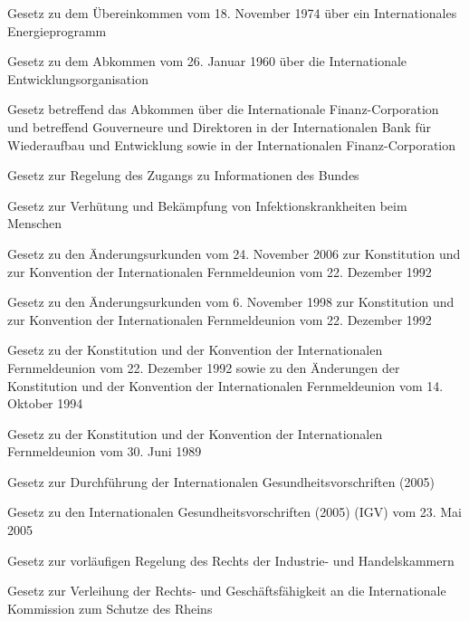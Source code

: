 \item[{IEnProgÜbkG}] Gesetz zu dem Übereinkommen vom 18. November 1974 über ein Internationales Energieprogramm

\item[{IEntwOrgAbkG}] Gesetz zu dem Abkommen vom 26. Januar 1960 über die Internationale Entwicklungsorganisation

\item[{IFCAbkG}] Gesetz betreffend das Abkommen über die Internationale Finanz-Corporation und betreffend Gouverneure und Direktoren in der Internationalen Bank für Wiederaufbau und Entwicklung sowie in der Internationalen Finanz-Corporation

\item[{IFG}] Gesetz zur Regelung des Zugangs zu Informationen des Bundes

\item[{IfSG}] Gesetz zur Verhütung und Bekämpfung von Infektionskrankheiten beim Menschen

\item[{IFUKK1992ÄndUrk1996G}] Gesetz zu den Änderungsurkunden vom 24. November 2006 zur Konstitution und zur Konvention der Internationalen Fernmeldeunion vom 22. Dezember 1992

\item[{IFUKK1992ÄndUrkG}] Gesetz zu den Änderungsurkunden vom 6. November 1998 zur Konstitution und zur Konvention der Internationalen Fernmeldeunion vom 22. Dezember 1992

\item[{IFUKK1992G}] Gesetz zu der Konstitution und der Konvention der Internationalen Fernmeldeunion vom 22. Dezember 1992 sowie zu den Änderungen der Konstitution und der Konvention der Internationalen Fernmeldeunion vom 14. Oktober 1994

\item[{IFUKKG}] Gesetz zu der Konstitution und der Konvention der Internationalen Fernmeldeunion vom 30. Juni 1989

\item[{IGV-DG}] Gesetz zur Durchführung der Internationalen Gesundheitsvorschriften (2005)

\item[{IGVG-2005}] Gesetz zu den Internationalen Gesundheitsvorschriften (2005) (IGV) vom 23. Mai 2005

\item[{IHKG}] Gesetz zur vorläufigen Regelung des Rechts der Industrie- und Handelskammern

\item[{IKSRRechtsG}] Gesetz zur Verleihung der Rechts- und Geschäftsfähigkeit an die Internationale Kommission zum Schutze des Rheins


